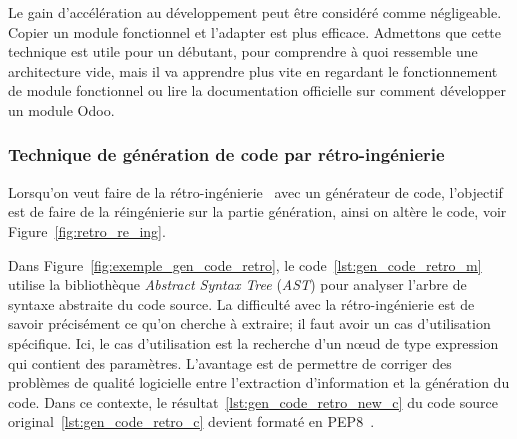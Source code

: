 Le gain d’accélération au développement peut être considéré comme négligeable. Copier un module fonctionnel et l'adapter est plus efficace. Admettons que cette technique est utile pour un débutant, pour comprendre à quoi ressemble une architecture vide, mais il va apprendre plus vite en regardant le fonctionnement de module fonctionnel ou lire la documentation officielle sur comment développer un module Odoo.

\subsubsection{Technique de génération de code par rétro-ingénierie}

Lorsqu'on veut faire de la rétro-ingénierie~\cite{wikipedia_retroingenierie} avec un générateur de code, l'objectif est de faire de la réingénierie sur la partie génération, ainsi on altère le code, voir Figure~\ref{fig:retro_re_ing}.

Dans Figure~\ref{fig:exemple_gen_code_retro}, le code~\ref{lst:gen_code_retro_m} utilise la bibliothèque \textit{Abstract Syntax Tree} (\textit{AST}) pour analyser l’arbre de syntaxe abstraite du code source. La difficulté avec la rétro-ingénierie est de savoir précisément ce qu’on cherche à extraire; il faut avoir un cas d’utilisation spécifique. Ici, le cas d’utilisation est la recherche d’un nœud de type expression qui contient des paramètres. L’avantage est de permettre de corriger des problèmes de qualité logicielle entre l’extraction d’information et la génération du code. Dans ce contexte, le résultat~\ref{lst:gen_code_retro_new_c} du code source original~\ref{lst:gen_code_retro_c} devient formaté en PEP8~\cite{python_pep8}.

